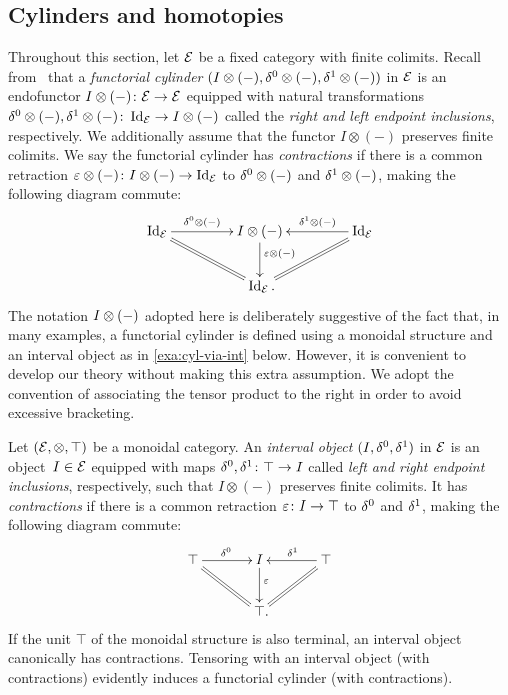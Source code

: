 \documentclass[reqno,10pt,a4paper,oneside,draft]{amsart}
\begin{document}
\subsection*{Cylinders and homotopies} Throughout this section, let $\mathcal{E}$ be a fixed category with finite colimits.
Recall from~\cite{kamps-porter:homotopy} that a \emph{functorial cylinder} $(I \otimes (-), \delta^0 \otimes (-), \delta^1 \otimes (-))$ in $\mathcal{E}$ is an endofunctor $I \otimes (-) \colon \mathcal{E} \to \mathcal{E}$ equipped with natural transformations $\delta^0 \otimes (-), \delta^1 \otimes (-) \colon \operatorname{Id}_{\mathcal{E}} \to I \otimes (-)$ called the \emph{right and left endpoint inclusions}, respectively.
We additionally assume that the functor $I \otimes (-)$ preserves finite colimits.
We say the functorial cylinder has \emph{contractions} if there is a common retraction $\varepsilon \otimes (-) \colon I \otimes (-) \to \operatorname{Id}_{\mathcal{E}}$ to $\delta^0 \otimes (-)$ and $\delta^1 \otimes (-)$, making the following diagram commute:
\[
\xymatrix@C+2em{
  \Id_\catE
  \ar[r]^-{\lcyl \otimes (-)}
  \ar@{=}[dr]
&
  \interval \otimes (-)
  \ar[d]^(0.4){\ccyl \otimes (-)}
&
  \Id_\catE
  \ar[l]_-{\rcyl \otimes (-)}
  \ar@{=}[dl]
\\&
  \Id_\catE
\rlap{.}}
\]
The notation $I \otimes (-)$ adopted here is deliberately suggestive of the fact that, in many examples, a functorial cylinder is defined using a monoidal structure and an interval object as in \cref{exa:cyl-via-int} below.
However, it is convenient to develop our theory without making this extra assumption.
We adopt the convention of associating the tensor product  to the right in order to avoid excessive bracketing.

\begin{example} \label{exa:cyl-via-int}
Let $(\mathcal{E}, \otimes, \top)$ be a monoidal category.
An \emph{interval object} $(I, \delta^0, \delta^1)$ in $\mathcal{E}$ is an object~$I \in \mathcal{E}$ equipped with maps $\delta^0, \delta^1 \colon \top \to I$ called \emph{left and right endpoint inclusions}, respectively, such that $I \otimes (-)$ preserves finite colimits.
It has \emph{contractions} if there is a common retraction $\varepsilon \colon I \to \top$ to $\delta^0$ and $\delta^1$, making the following diagram commute:
\[
\xymatrix@C+1em{
  \top
  \ar[r]^{\lcyl}
  \ar@{=}[dr]
&
  \interval
  \ar[d]^(0.4){\ccyl}
&
  \top
  \ar[l]_{\rcyl}
  \ar@{=}[dl]
\\&
  \top
\rlap{.}}
\]
If the unit $\top$ of the monoidal structure is also terminal, an interval object canonically has contractions.
Tensoring with an interval object (with contractions) evidently induces a functorial cylinder (with contractions).
\end{example}
\end{document}
